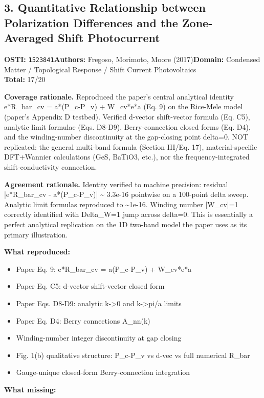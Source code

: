 \subsection{3. Quantitative Relationship between Polarization Differences and the Zone-Averaged Shift Photocurrent}
\textbf{OSTI:} \texttt{1523841}\quad\textbf{Authors:} Fregoso, Morimoto, Moore (2017)\quad\textbf{Domain:} Condensed Matter / Topological Response / Shift Current Photovoltaics\\
\quad{}\quad\textbf{Total:} 17/20\par\smallskip
\noindent\textbf{Coverage rationale.} Reproduced the paper's central analytical identity e*R\_bar\_cv = a*(P\_c-P\_v) + W\_cv*e*a (Eq. 9) on the Rice-Mele model (paper's Appendix D testbed). Verified d-vector shift-vector formula (Eq. C5), analytic limit formulae (Eqs. D8-D9), Berry-connection closed forms (Eq. D4), and the winding-number discontinuity at the gap-closing point delta=0. NOT replicated: the general multi-band formula (Section III/Eq. 17), material-specific DFT+Wannier calculations (GeS, BaTiO3, etc.), nor the frequency-integrated shift-conductivity connection.\par
\noindent\textbf{Agreement rationale.} Identity verified to machine precision: residual |e*R\_bar\_cv - a*(P\_c-P\_v)| \textasciitilde{} 3.3e-16 pointwise on a 100-point delta sweep. Analytic limit formulas reproduced to \textasciitilde{}1e-16. Winding number |W\_cv|=1 correctly identified with Delta\_W=1 jump across delta=0. This is essentially a perfect analytical replication on the 1D two-band model the paper uses as its primary illustration.\par\smallskip
\noindent\textbf{What reproduced:}
\begin{itemize}[leftmargin=1.4em,itemsep=0.2em,topsep=0.2em]
\item Paper Eq. 9: e*R\_bar\_cv = a(P\_c-P\_v) + W\_cv*e*a
\item Paper Eq. C5: d-vector shift-vector closed form
\item Paper Eqs. D8-D9: analytic k-\textgreater{}0 and k-\textgreater{}pi/a limits
\item Paper Eq. D4: Berry connections A\_nn(k)
\item Winding-number integer discontinuity at gap closing
\item Fig. 1(b) qualitative structure: P\_c-P\_v vs d-vec vs full numerical R\_bar
\item Gauge-unique closed-form Berry-connection integration
\end{itemize}\noindent\textbf{What missing:}
